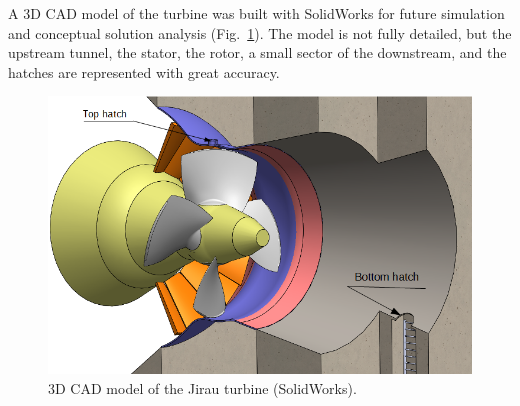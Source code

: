 A 3D CAD model of the turbine was built with
SolidWorks\raisebox{1ex}{\textregistered} for future simulation and conceptual
solution analysis (Fig.~\ref{fig::ambiente3d}). The model is not fully
detailed, but the upstream tunnel, the stator, the rotor, a small sector of the downstream, and the hatches are represented with great accuracy.

\begin{figure}[h!]
\centering
	\includegraphics[width=\columnwidth]{figs/estudo/solid/ambiente_3d} 
	\caption{3D CAD model of the Jirau turbine
	(SolidWorks\raisebox{1ex}{\textregistered}).}
	\label{fig::ambiente3d}
\end{figure}




